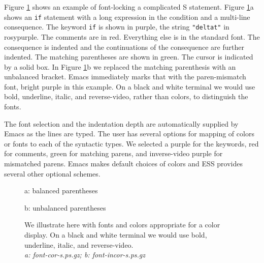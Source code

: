 \documentclass{article}
\newif\ifdraft
\newcommand{\stexttt}[1]{{\small\texttt{#1}}}
\newcommand{\emptyfig}{
\hspace*{42pt}\rule{324pt}{.25pt}\\
\hspace*{42pt}\rule{.25pt}{10pc}
\rule{316pt}{.25pt}
\rule{.25pt}{10pc}}
\begin{document}
Figure \ref{f.font} shows an example of font-locking a
complicated S statement.  Figure \ref{f.font}a shows an \stexttt{if}
statement with a long expression in the condition and a multi-line
consequence.  The keyword \stexttt{if} is shown in purple,
the string \stexttt{"deltat"} in rosypurple.  The
comments are in red.  Everything else is in the standard
font.  The consequence is indented and the continuations of the
consequence are further indented.  The matching parentheses are shown
in green.  The cursor is indicated
by a solid box.  In Figure \ref{f.font}b we replaced the matching
parenthesis with an unbalanced bracket.  Emacs immediately marks that
with the paren-mismatch font, bright purple in this example.
On a black and white terminal we would use bold, underline, italic,
and reverse-video, rather than colors, to distinguish the fonts.


The font selection and the indentation depth are automatically
supplied by Emacs as the lines are typed.  The user has several
options for mapping of colors or fonts to each of the syntactic types.
We selected a 
purple for the keywords, red for comments, green
for matching parens, and inverse-video purple for mismatched parens.
Emacs makes default choices of colors and ESS
provides several other optional schemes.

\begin{figure}
a: balanced parentheses\\
\ifdraft
  \emptyfig
\else
\fi

b: unbalanced parentheses\\
\ifdraft
  \emptyfig
\else
\fi
\caption[Syntactic highlighting and indentation of source code.]
{We illustrate here with fonts and colors appropriate for a color display.
On a black and white terminal we would use bold, underline, italic,
and reverse-video.
\\
{\it a: font-cor-s.ps.gz; b: font-incor-s.ps.gz}
\label{f.font}}
\end{figure}
\end{document}
